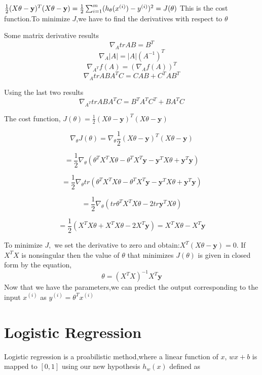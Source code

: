 \documentclass[12pt]{article}
\begin{document}
 
 $\frac{1}{2}(X\theta-\textbf y)^{T}(X\theta-\textbf y)=\frac{1}{2} \sum_{i=1}^{m}(h_{\theta}(x^{(i)})-y^{(i)})^{2}=J(\theta)$ This is the cost function.To minimize $J$,we have to find the derivatives with respect to $\theta$
 
 
 
 
Some matrix derivative results
 $$\nabla_{A}tr AB = B^{T}$$ 
 $$\nabla_{A}\vert A\vert=\vert A\vert(A^{-1})^{T}$$ 
 $$\nabla_{A^{T}}f(A)= (\nabla_{A}f(A))^{T}$$ 
 $$\nabla_{A}trABA^{T}C=CAB+C^{T}AB^{T}$$
 
 
 Using the last two results 
 $$\nabla_{A^{T}}trABA^{T}C=B^{T}A^{T}C^{T}+BA^{T}C$$
 
 
 
 The cost function,  $J(\theta)=\frac{1}{2}(X\theta-\textbf{y})^{T}(X\theta-\textbf{y})$
 
 
$$ \nabla_{\theta} J(\theta)  =\nabla_{\theta}\frac{1}{2}(X\theta-\textbf{y})^{T}(X\theta-\textbf{y}) $$
 
 
 
  $$=\frac{1}{2}\nabla_{\theta}(\theta^{T}X^{T}X\theta-\theta^{T}X^{T}\textbf{y}-\textbf{y}^{T}X\theta+\textbf{y}^{T}\textbf{y}) $$
 
 
 
$$ =\frac{1}{2}\nabla_{\theta} tr(\theta^{T}X^{T}X\theta-\theta^{T}X^{T}\textbf{y}-\textbf{y}^{T}X\theta+\textbf{y}^{T}\textbf{y}) $$
 
 
 
 
$$=\frac{1}{2}\nabla_{\theta}(tr \theta^{T}X^{T}X\theta-2tr\textbf{y}^{T}X\theta)  $$
 
 

$$=\frac{1}{2}(X^{T}X\theta+X^{T}X\theta-2X^{T}\textbf{y})  =X^{T}X\theta-X^{T}\textbf{y} $$







To minimize $J,$ we set the derivative to zero and obtain:$X^{T}(X\theta-\textbf{y})=0$. If $X^{T}X$ is nonsingular then the value of $\theta $ that minimizes $J(\theta)$ is given in closed form by the equation,
$$\theta=(X^{T}X)^{-1}X^{T}\textbf{y}$$
Now that we have the parameters,we can predict the output corresponding to the input $x^{(i)}$ as $y^{(i)}=\theta^{T}x^{(i)}$

\section{Logistic Regression}
Logistic regression is a proabilistic method,where a linear function of $x$, $wx + b $ is mapped to $[0,1]$ using our new hypothesis $h_{w}(x)$ defined as 
\end{document}
